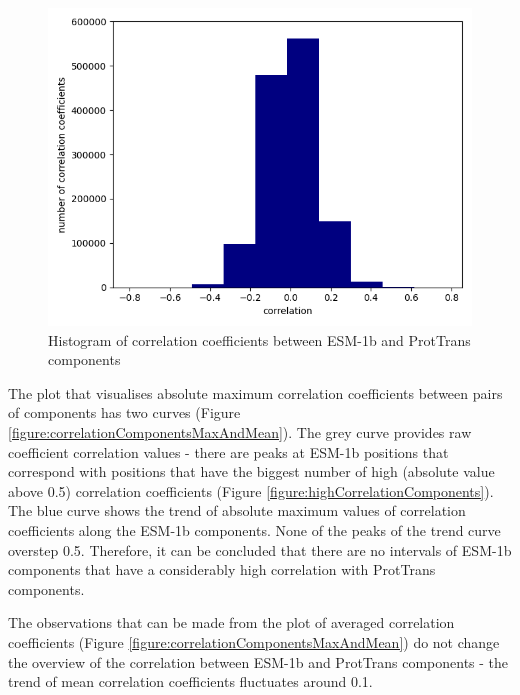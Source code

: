 \documentclass[12pt]{article}
\begin{document}
	\newpage

	\begin{figure}[h!]
		\centering
		\includegraphics[scale=0.85]{validation_small_set_2_joined_correlation_hist.png}

		\caption{Histogram of correlation coefficients between ESM-1b 
		and ProtTrans components}
		\label{figure:correlationComponentsHisto}
	\end{figure}

	\newpage

	The plot that visualises absolute maximum correlation coefficients between 
	pairs of components has two curves (Figure \ref{figure:correlationComponentsMaxAndMean}). 
	The grey curve provides raw coefficient correlation values - there are peaks 
	at ESM-1b positions that correspond with positions that have the 
	biggest number of high (absolute value above 0.5) correlation coefficients
	(Figure \ref{figure:highCorrelationComponents}). The blue curve shows the trend 
	of absolute maximum values of correlation coefficients along the ESM-1b components.
	None of the peaks of the trend curve overstep 0.5. Therefore, it can 
	be concluded that there are no intervals of ESM-1b components that have 
	a considerably high correlation with ProtTrans components.

	The observations that can be made from the plot of averaged correlation 
	coefficients (Figure \ref{figure:correlationComponentsMaxAndMean}) do not change the 
	overview of the correlation between 
	ESM-1b and ProtTrans components - the trend of mean correlation coefficients 
	fluctuates around 0.1.
\end{document}
